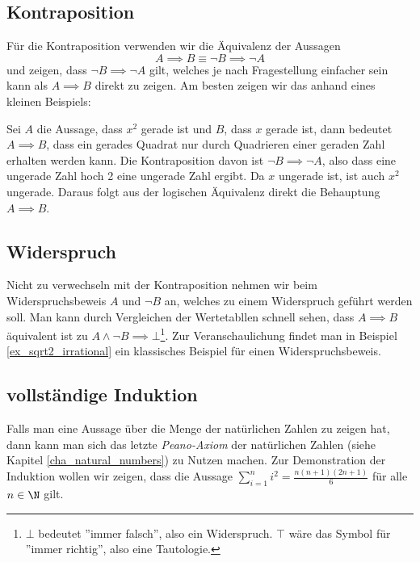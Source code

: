 \subsection{Kontraposition}
Für die Kontraposition verwenden wir die Äquivalenz der Aussagen
$$A \implies B \equiv \neg B \implies \neg A$$
und zeigen, dass $\neg B \implies \neg A$ gilt, welches je nach Fragestellung einfacher sein kann als $A \implies B$ direkt zu zeigen. Am besten zeigen wir das anhand eines kleinen Beispiels:
\begin{example}[Kontraposition]\label{ex_counterpos}
    Sei $A$ die Aussage, dass $x^2$ gerade ist und $B$, dass $x$ gerade ist, dann bedeutet $A \implies B$, dass ein gerades Quadrat nur durch Quadrieren einer geraden Zahl erhalten werden kann. Die Kontraposition davon ist $\neg B \implies \neg A$, also dass eine ungerade Zahl hoch 2 eine ungerade Zahl ergibt. Da $x$ ungerade ist, ist auch $x^2$ ungerade. Daraus folgt aus der logischen Äquivalenz direkt die Behauptung $A \implies B$.
\end{example}

\subsection{Widerspruch}
Nicht zu verwechseln mit der Kontraposition nehmen wir beim Widerspruchsbeweis $A$ und $\neg B$ an, welches zu einem Widerspruch geführt werden soll. Man kann durch Vergleichen der Wertetabllen schnell sehen, dass $A \implies B$ äquivalent ist zu $A \land \neg B \implies \bot$\footnote{$\bot$ bedeutet ''immer falsch'', also ein Widerspruch. $\top$ wäre das Symbol für ''immer richtig'', also eine Tautologie.}. Zur Veranschaulichung findet man in Beispiel \ref{ex_sqrt2_irrational} ein klassisches Beispiel für einen Widerspruchsbeweis.

\subsection{vollständige Induktion} \label{cha_induction}
Falls man eine Aussage über die Menge der natürlichen Zahlen zu zeigen hat, dann kann man sich das letzte \textit{Peano-Axiom} der natürlichen Zahlen (siehe Kapitel \ref{cha_natural_numbers}) zu Nutzen machen. Zur Demonstration der Induktion wollen wir zeigen, dass die Aussage $\sum_{i = 1}^ni^2 = \frac{n(n+1)(2n+1)}{6}$ für alle $n \in \N$ gilt.

